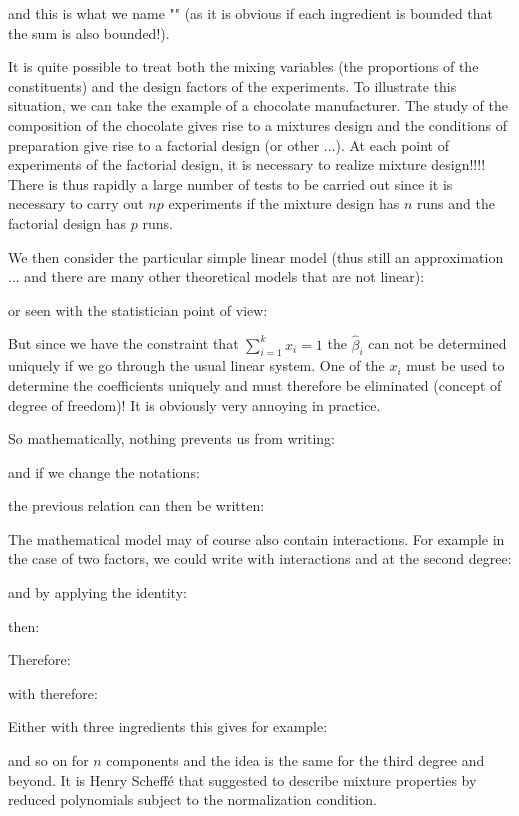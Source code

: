	and this is what we name "" (as it is obvious if each ingredient is bounded that the sum is also bounded!).
	\begin{tcolorbox}[title=Remark,colframe=black,arc=10pt]
	It is quite possible to treat both the mixing variables (the proportions of the constituents) and the design factors of the experiments. To illustrate this situation, we can take the example of a chocolate manufacturer. The study of the composition of the chocolate gives rise to a mixtures design and the conditions of preparation give rise to a factorial design (or other ...). At each point of experiments of the factorial design, it is necessary to realize mixture design!!!! There is thus rapidly a large number of tests to be carried out since it is necessary to carry out $np$ experiments if the mixture design has $n$ runs and the factorial design has $p$ runs.
	\end{tcolorbox}
	We then consider the particular simple linear model (thus still an approximation ... and there are many other theoretical models that are not linear):
	
	or seen with the statistician point of view:
	
 	But since we have the constraint that $\sum_{i=1}^k x_i=1$ the $\hat{\beta}_i$ can not be determined uniquely if we go through the usual linear system. One of the $x_i$ must be used to determine the coefficients uniquely and must therefore be eliminated (concept of degree of freedom)! It is obviously very annoying in practice.

	So mathematically, nothing prevents us from writing:
	
 	and if we change the notations:
	
 	the previous relation can then be written:
	
	The mathematical model may of course also contain interactions. For example in the case of two factors, we could write with interactions and at the second degree:
	
 	and by applying the identity:
	
 	then:
	
	Therefore:
 	
	with therefore:
	
 	Either with three ingredients this gives for example:
	
 	and so on for $n$ components and the idea is the same for the third degree and beyond. It is Henry Scheffé that suggested to describe mixture properties by reduced polynomials subject to the normalization condition.
	
